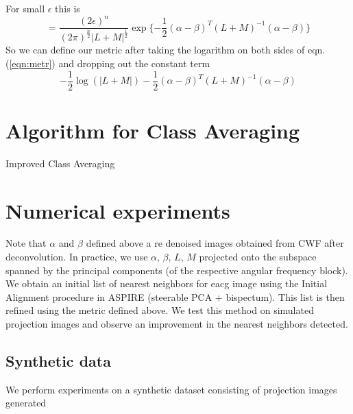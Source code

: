 \documentclass{article}
\begin{document}
For small $\epsilon$ this is
\begin{equation}
= \frac{(2 \epsilon)^n}{(2 \pi)^{\frac{n}{2}} |L + M|^{\frac{1}{2}}} \exp\{-\frac{1}{2}(\alpha - \beta)^T(L+M)^{-1}(\alpha -\beta)\} 
\label{eqn:metr}
\end{equation}
So we can define our metric after taking the logarithm on both sides of eqn.(\ref{eqn:metr}) and dropping out the constant term
\begin{equation}
 -\frac{1}{2}\log(|L + M|) -\frac{1}{2}(\alpha - \beta)^T(L+M)^{-1}(\alpha -\beta)
\end{equation}


\section{Algorithm for Class Averaging}
\begin{algorithm}
\caption{Improved Class Averaging}\label{euclid}
\begin{algorithmic}[1]
\EndProcedure
{}
\EndProcedure
{}
\EndProcedure
\end{algorithmic}
\end{algorithm}

\section{Numerical experiments}
Note that $\alpha$ and $\beta$ defined above a
re denoised images obtained from CWF after deconvolution. In practice, we use $\alpha$, $\beta$, $L$, $M$ projected onto the subspace spanned by the principal components (of the respective angular frequency block).
We obtain an initial list of nearest neighbors for eacg image using the Initial Alignment procedure in ASPIRE (steerable PCA + bispectum). This list is then refined using the metric defined above.
We test this method on simulated projection images and observe an improvement in the nearest neighbors detected. 


\subsection{Synthetic data}
We perform experiments on a synthetic dataset consisting of projection images generated 
\end{document}
